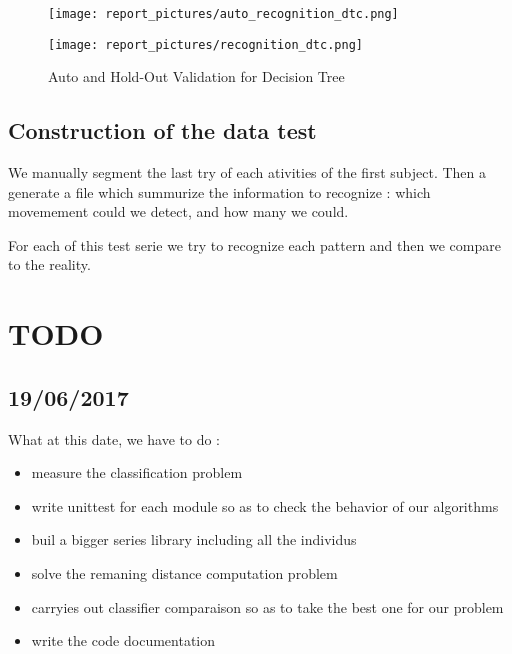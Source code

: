 \documentclass[a4,12pt]{article}
\begin{document}
	\begin{figure}[H]
		\centering
			\begin{minipage}[c]{.46\linewidth}
      			\texttt{[image: report\_pictures/auto\_recognition\_dtc.png]}
  			\end{minipage} \hfill
   			\begin{minipage}[c]{.46\linewidth}
      			\texttt{[image: report\_pictures/recognition\_dtc.png]}
   			\end{minipage}
		\caption{Auto and Hold-Out Validation for Decision Tree}
		\label{dtc}
	\end{figure}
	
	
	\subsection{Construction of the data test}
	
		We manually segment the last try of each ativities of the first subject. Then a generate a file which summurize the information to recognize : which movemement could we detect, and how many we could.
		
		For each of this test serie we try to recognize each pattern and then we compare to the reality.
		
	\section{TODO}
	
	\subsection{19/06/2017}

	What at this date, we have to do :
	\begin{itemize}
		\item measure the classification problem
		\item write unittest for each module so as to check the behavior of our algorithms
		\item buil a bigger series library including all the individus
		\item solve the remaning distance computation problem
		\item carryies out classifier comparaison so as to take the best one for our problem
		\item write the code documentation
	\end{itemize}		

	
		
	
	
\end{document}
